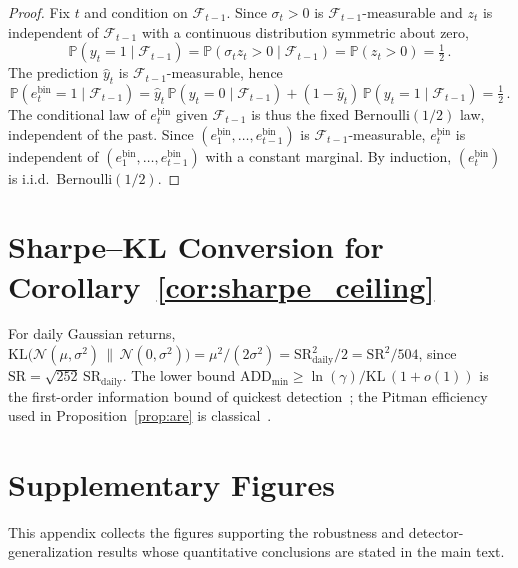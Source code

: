 \documentclass[sigconf,anonymous,review]{acmart}
\theoremstyle{acmdefinition}
\begin{document}
\begin{proof}
    Fix $t$ and condition on $\mathcal{F}_{t-1}$.
    Since $\sigma_t > 0$ is $\mathcal{F}_{t-1}$-measurable and $z_t$ is independent of $\mathcal{F}_{t-1}$ with a continuous distribution symmetric about zero,
    \[
        \mathbb{P}(y_t = 1 \mid \mathcal{F}_{t-1}) = \mathbb{P}(\sigma_t z_t > 0 \mid \mathcal{F}_{t-1}) = \mathbb{P}(z_t > 0) = \tfrac{1}{2}\,.
    \]
    The prediction $\widehat{y}_t$ is $\mathcal{F}_{t-1}$-measurable, hence
    \[
        \mathbb{P}(e^{\mathrm{bin}}_t = 1 \mid \mathcal{F}_{t-1})
        = \widehat{y}_t\,\mathbb{P}(y_t = 0 \mid \mathcal{F}_{t-1}) + (1-\widehat{y}_t)\,\mathbb{P}(y_t = 1 \mid \mathcal{F}_{t-1})
        = \tfrac{1}{2}\,.
    \]
    The conditional law of $e^{\mathrm{bin}}_t$ given $\mathcal{F}_{t-1}$ is thus the fixed Bernoulli$(1/2)$ law, independent of the past.
    Since $(e^{\mathrm{bin}}_1, \dots, e^{\mathrm{bin}}_{t-1})$ is $\mathcal{F}_{t-1}$-measurable, $e^{\mathrm{bin}}_t$ is independent of $(e^{\mathrm{bin}}_1, \dots, e^{\mathrm{bin}}_{t-1})$ with a constant marginal.
    By induction, $(e^{\mathrm{bin}}_t)$ is i.i.d.\ Bernoulli$(1/2)$.
\end{proof}

\section{Sharpe--KL Conversion for Corollary~\ref{cor:sharpe_ceiling}}\label{app:sharpekl}
For daily Gaussian returns, $\mathrm{KL}\big(\mathcal{N}(\mu,\sigma^2)\,\|\,\mathcal{N}(0,\sigma^2)\big) = \mu^2/(2\sigma^2) = \mathrm{SR}_{\mathrm{daily}}^2/2 = \mathrm{SR}^2/504$, since $\mathrm{SR} = \sqrt{252}\,\mathrm{SR}_{\mathrm{daily}}$. The lower bound $\mathrm{ADD}_{\min} \ge \ln(\gamma)/\mathrm{KL}\,(1+o(1))$ is the first-order information bound of quickest detection~\cite{tartakovsky_2014}; the Pitman efficiency used in Proposition~\ref{prop:are} is classical~\cite{vandervaart_1998}.

\section{Supplementary Figures}\label{app:figures}
\FloatBarrier %

This appendix collects the figures supporting the robustness and detector-generalization results whose quantitative conclusions are stated in the main text.
\end{document}

